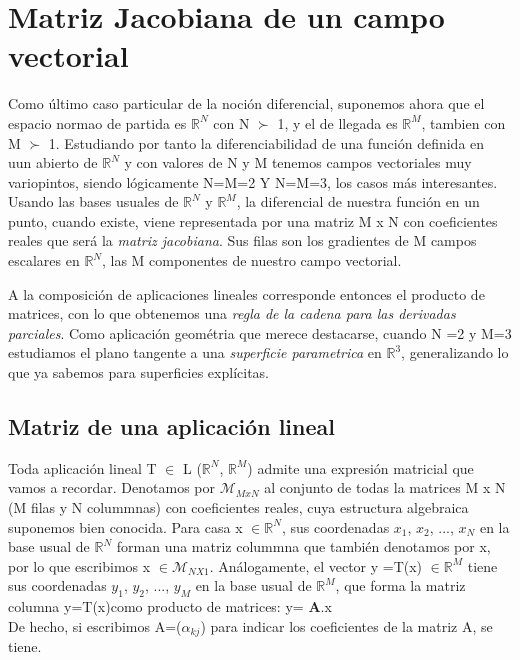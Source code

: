 \documentclass[letter,openrigh,12pt,spanish]{report}
\begin{document}
\section{Matriz Jacobiana de un campo vectorial}

Como \'ultimo caso particular de la noci\'on diferencial, suponemos ahora que el espacio normao de partida es $\mathbb{R}^N$ con N $\succ$ 1, y el de llegada es $\mathbb{R}^M$, tambien con M $\succ$ 1. Estudiando por tanto la diferenciabilidad de una funci\'on definida en uun abierto de $\mathbb{R}^N$ y con valores de N y M tenemos campos vectoriales muy variopintos, siendo l\'ogicamente N=M=2 Y N=M=3, los casos m\'as interesantes. Usando las bases usuales de $\mathbb{R}^N$ y $\mathbb{R}^M$, la diferencial de nuestra funci\'on en un punto, cuando existe, viene representada por una matriz M x N con coeficientes reales que ser\'a la \textit{matriz jacobiana}. Sus filas son los gradientes de M campos escalares en $\mathbb{R}^N$, las M componentes de nuestro campo vectorial. 

A la composici\'on de aplicaciones lineales corresponde entonces el producto de matrices, con lo que obtenemos una \textit{regla de la cadena para las derivadas parciales}. Como aplicaci\'on geom\'etria que merece destacarse, cuando N =2 y M=3 estudiamos el plano tangente a una \textit{superficie parametrica} en $\mathbb{R}^3$, generalizando lo que ya sabemos para superficies expl\'icitas.

\subsection{Matriz de una aplicaci\'on lineal}

Toda aplicaci\'on lineal T $\in$ L ($\mathbb{R}^N$, $\mathbb{R}^M$) admite una expresi\'on matricial que vamos a recordar. Denotamos por $\mathcal{M}_{MxN}$ al conjunto de todas la matrices M x N (M filas y N colummnas) con coeficientes reales, cuya estructura algebraica suponemos bien conocida. Para casa x $\in$$\mathbb{R}^N$, sus coordenadas $x_1$, $x_2$, ..., $x_N$ en la base usual de $\mathbb{R}^N$ forman una matriz colummna que tambi\'en denotamos por x, por lo que escribimos x $\in$$\mathcal{M}_{NX1}$. An\'alogamente, el vector y =T(x) $\in$$\mathbb{R}^M$ tiene sus coordenadas $y_1$, $y_2$, ..., $y_M$ en la base usual de $\mathbb{R}^M$, que forma la matriz columna y=T(x)como producto de matrices: y= \textbf{A}.x\\

De hecho, si escribimos A=($\alpha_{kj}$) para indicar los coeficientes de la matriz A, se tiene.
\end{document}
